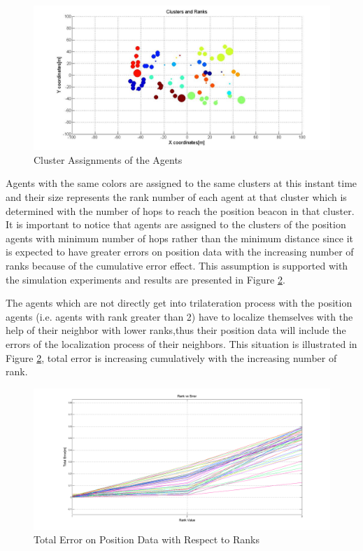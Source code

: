 \begin{figure}[H]
\caption{Cluster Assignments of the Agents} \label{Cluster_figure}
\centerline{\includegraphics[scale = 0.4]{Clusters_Ranks_1}}
\end{figure} 

Agents with the same colors are assigned to the same clusters at this instant time and their size represents the rank number of each agent at that cluster which is determined with the number of hops to reach the position beacon in that cluster. It is important to notice that agents are assigned to the clusters of the position agents with minimum number of hops rather than the minimum distance since it is expected to have greater errors on position data with the increasing number of ranks because of the cumulative error effect. This assumption is supported with the simulation experiments and results are presented in Figure \ref{cumulative_effect}. 

The agents which are not directly get into trilateration process with the position agents (i.e. agents with rank greater than 2) have to localize themselves with the help of their neighbor with lower ranks,thus their position data will include the errors of the localization process of their neighbors. This situation is illustrated in Figure \ref{cumulative_effect}, total error is increasing cumulatively with the increasing number of rank. 
	
\begin{figure}[H]
\caption{Total Error on Position Data with Respect to Ranks} \label{cumulative_effect}
\centerline{\includegraphics[scale = 0.35]{rank_vs_error}}
\end{figure} 
	
